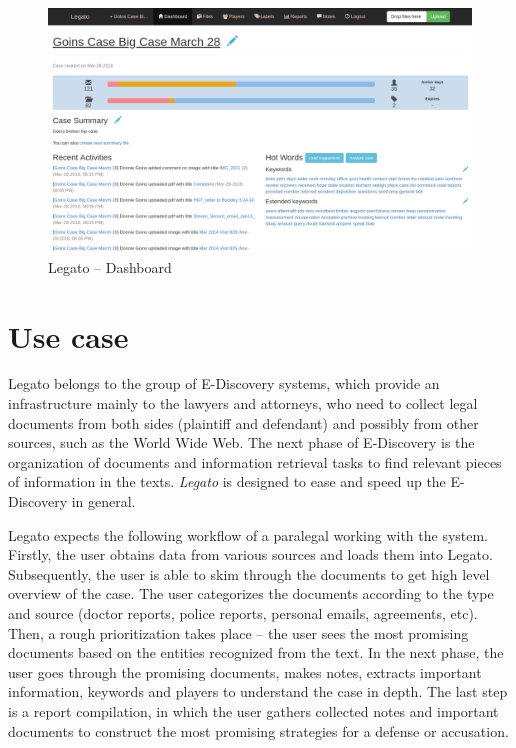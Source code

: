 \documentclass[
  digital, %
  notable,   %
  nolof,     %
  nolot,     %
]{fithesis3}
\begin{document}
\begin{figure}[h]
\caption{Legato -- Dashboard}
\label{fig:legato_dashboard}
\includegraphics[width=\textwidth]{img/Legato-Dashboard}
\end{figure}


\section{Use case}
\label{sec:legato_usecase}
Legato belongs to the group of E-Discovery systems, which provide an infrastructure mainly to the lawyers and attorneys, who need to collect legal documents from both sides (plaintiff and defendant) and possibly from other sources, such as the World Wide Web.
The next phase of E-Discovery is the organization of documents and information retrieval tasks to find relevant pieces of information in the texts.
\textit{Legato} is designed to ease and speed up the E-Discovery in general.

Legato expects the following workflow of a paralegal working with the system.
Firstly, the user obtains data from various sources and loads them into Legato.
Subsequently, the user is able to skim through the documents to get high level overview of the case.
The user categorizes the documents according to the type and source (doctor reports, police reports, personal emails, agreements, etc).
Then, a rough prioritization takes place -- the user sees the most promising documents based on the entities recognized from the text.
In the next phase, the user goes through the promising documents, makes notes, extracts important information, keywords and players to understand the case in depth.
The last step is a report compilation, in which the user gathers collected notes and important documents to construct the most promising strategies for a defense or accusation.
\end{document}
